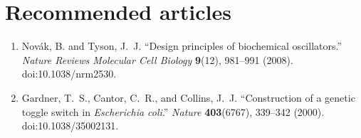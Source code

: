 \documentclass[12pt,a4paper]{article}
\begin{document}
\section{Recommended articles}
\begin{enumerate}[label=(\alph*)]
  \item Novák, B. and Tyson, J.~J. ``Design principles of biochemical oscillators.'' \textit{Nature Reviews Molecular Cell Biology} \textbf{9}(12), 981--991 (2008). doi:10.1038/nrm2530.
  \item Gardner, T.~S., Cantor, C.~R., and Collins, J.~J. ``Construction of a genetic toggle switch in \textit{Escherichia coli}.'' \textit{Nature} \textbf{403}(6767), 339--342 (2000). doi:10.1038/35002131.
\end{enumerate}

\end{document}
